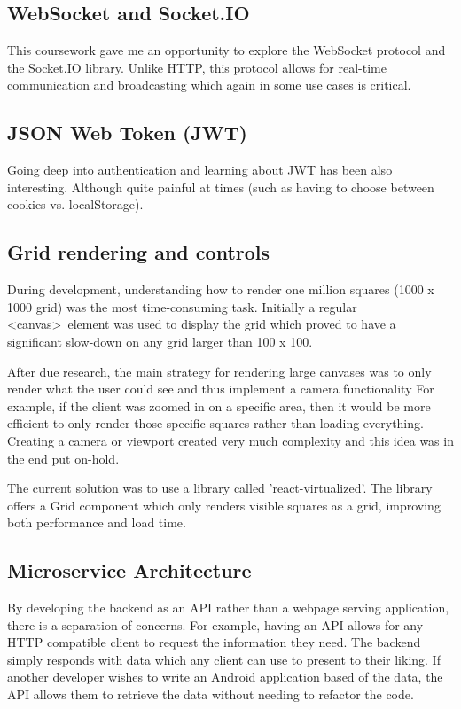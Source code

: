\subsection{WebSocket and Socket.IO}\label{subsec:websocket-and-socket.io}
This coursework gave me an opportunity to explore the WebSocket protocol and the Socket.IO library.
Unlike HTTP, this protocol allows for real-time communication and broadcasting which again in some use cases is critical.

\subsection{JSON Web Token (JWT)}\label{subsec:json-web-token-(jwt)}
Going deep into authentication and learning about JWT has been also interesting.
Although quite painful at times (such as having to choose between cookies vs. localStorage).

\subsection{Grid rendering and controls}\label{subsec:grid-rendering}
During development, understanding how to render one million squares (1000 x 1000 grid) was the most time-consuming task.
Initially a regular \textless canvas\textgreater~element was used to display the grid which proved to have a significant slow-down on any grid larger than 100 x 100.

After due research, the main strategy for rendering large canvases was to only render what the user could see and thus implement a camera functionality
For example, if the client was zoomed in on a specific area, then it would be more efficient to only render those specific squares rather than loading everything.
Creating a camera or viewport created very much complexity and this idea was in the end put on-hold.

The current solution was to use a library called 'react-virtualized'.
The library offers a Grid component which only renders visible squares as a grid, improving both performance and load time.

\subsection{Microservice Architecture}\label{subsec:microservice-architecture}
By developing the backend as an API rather than a webpage serving application, there is a separation of concerns.
For example, having an API allows for any HTTP compatible client to request the information they need.
The backend simply responds with data which any client can use to present to their liking.
If another developer wishes to write an Android application based of the data, the API allows them to retrieve the data without needing to refactor the code.

